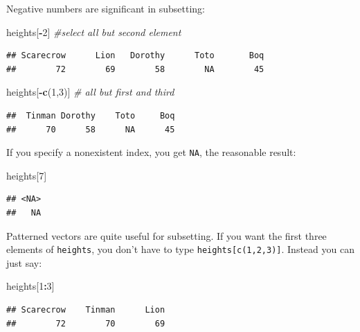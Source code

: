 \documentclass[]{book}
\makeatletter
\newenvironment{Shaded}{\begin{snugshade}}{\end{snugshade}}
\newcommand{\KeywordTok}[1]{\textcolor[rgb]{0.13,0.29,0.53}{\textbf{#1}}}
\newcommand{\DecValTok}[1]{\textcolor[rgb]{0.00,0.00,0.81}{#1}}
\newcommand{\CommentTok}[1]{\textcolor[rgb]{0.56,0.35,0.01}{\textit{#1}}}
\newcommand{\OperatorTok}[1]{\textcolor[rgb]{0.81,0.36,0.00}{\textbf{#1}}}
\newcommand{\NormalTok}[1]{#1}
\newenvironment{kframe}{%
\medskip{}
\setlength{\fboxsep}{.8em}
 \def\at@end@of@kframe{}%
 \ifinner\ifhmode%
  \def\at@end@of@kframe{\end{minipage}}%
  \begin{minipage}{\columnwidth}%
 \fi\fi%
 \def\FrameCommand##1{\hskip\@totalleftmargin \hskip-\fboxsep
 \colorbox{shadecolor}{##1}\hskip-\fboxsep
     \hskip-\linewidth \hskip-\@totalleftmargin \hskip\columnwidth}%
 \MakeFramed {\advance\hsize-\width
   \@totalleftmargin\z@ \linewidth\hsize
   \@setminipage}}%
 {\par\unskip\endMakeFramed%
 \at@end@of@kframe}
\renewenvironment{Shaded}{\begin{kframe}}{\end{kframe}}
\theoremstyle{definition}
\theoremstyle{definition}
\theoremstyle{definition}
\theoremstyle{remark}
\makeatother
\begin{document}
Negative numbers are significant in subsetting:

\begin{Shaded}
\begin{Highlighting}[]
\NormalTok{heights[}\OperatorTok{-}\DecValTok{2}\NormalTok{] }\CommentTok{#select all but second element}
\end{Highlighting}
\end{Shaded}

\begin{verbatim}
## Scarecrow      Lion   Dorothy      Toto       Boq 
##        72        69        58        NA        45
\end{verbatim}

\begin{Shaded}
\begin{Highlighting}[]
\NormalTok{heights[}\OperatorTok{-}\KeywordTok{c}\NormalTok{(}\DecValTok{1}\NormalTok{,}\DecValTok{3}\NormalTok{)]  }\CommentTok{# all but first and third}
\end{Highlighting}
\end{Shaded}

\begin{verbatim}
##  Tinman Dorothy    Toto     Boq 
##      70      58      NA      45
\end{verbatim}

If you specify a nonexistent index, you get \texttt{NA}, the reasonable
result:

\begin{Shaded}
\begin{Highlighting}[]
\NormalTok{heights[}\DecValTok{7}\NormalTok{]}
\end{Highlighting}
\end{Shaded}

\begin{verbatim}
## <NA> 
##   NA
\end{verbatim}

Patterned vectors are quite useful for subsetting. If you want the first
three elements of \texttt{heights}, you don't have to type
\texttt{heights{[}c(1,2,3){]}}. Instead you can just say:

\begin{Shaded}
\begin{Highlighting}[]
\NormalTok{heights[}\DecValTok{1}\OperatorTok{:}\DecValTok{3}\NormalTok{]}
\end{Highlighting}
\end{Shaded}

\begin{verbatim}
## Scarecrow    Tinman      Lion 
##        72        70        69
\end{verbatim}
\end{document}
